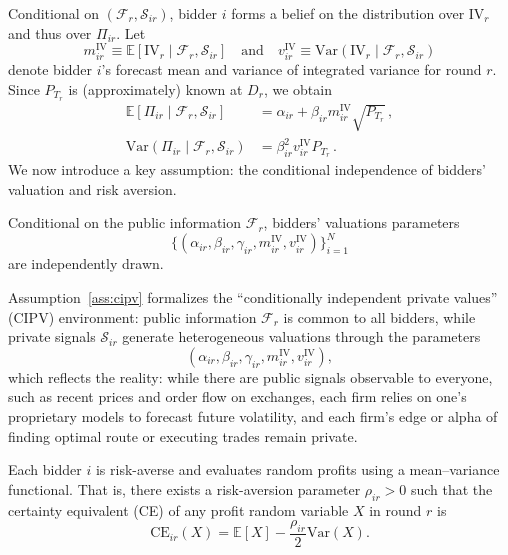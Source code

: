 \documentclass[runningheads]{llncs}
\newcommand{\E}{\mathbb{E}}
\newcommand{\Var}{\mathrm{Var}}
\newcommand{\CE}{\mathrm{CE}}
\newcommand{\IV}{\mathrm{IV}}
\begin{document}
Conditional on $(\mathcal F_r, \mathcal S_{ir})$, bidder $i$ forms a belief on the distribution over $\IV_r$ and thus over $\Pi_{ir}$. Let
\begin{equation}
m^{\IV}_{ir} \equiv \E\left[\IV_r \mid \mathcal F_r, \mathcal S_{ir} \right] \quad \text{and} \quad v^{\IV}_{ir} \equiv \Var\left(\IV_r \mid \mathcal F_r, \mathcal S_{ir} \right)
\end{equation}
denote bidder $i$'s forecast mean and variance of integrated variance for round $r$. Since $P_{T_r}$ is (approximately) known at $D_r$, we obtain
\begin{align}
  \E\!\left[\Pi_{ir} \mid \mathcal F_r, \mathcal S_{ir} \right]
    &= \alpha_{ir} + \beta_{ir} m^{\IV}_{ir} \sqrt{P_{T_r}} \, , \label{eq:profit-mean} \\
  \Var\!\left(\Pi_{ir} \mid \mathcal F_r, \mathcal S_{ir} \right)
    &= \beta_{ir}^2 v^{\IV}_{ir} P_{T_r} \, . \label{eq:profit-var}
\end{align}
We now introduce a key assumption: the conditional independence of bidders' valuation and risk aversion.

\begin{assump}[CIPV]\label{ass:cipv}
Conditional on the public information $\mathcal F_r$, bidders' valuations parameters \[\{(\alpha_{ir}, \beta_{ir}, \gamma_{ir}, m^{\IV}_{ir}, v^{\IV}_{ir})\}_{i=1}^N\] are independently drawn.
\end{assump}

\noindent Assumption~\ref{ass:cipv} formalizes the ``conditionally independent private values'' (CIPV) environment: public information $\mathcal F_r$ is common to all bidders, while private signals $\mathcal S_{ir}$ generate heterogeneous valuations through the parameters \[(\alpha_{ir}, \beta_{ir}, \gamma_{ir}, m^{\IV}_{ir}, v^{\IV}_{ir}),\] which reflects the reality: while there are public signals observable to everyone, such as recent prices and order flow on exchanges, each firm relies on one's proprietary models to forecast future volatility, and each firm's edge or alpha of finding optimal route or executing trades remain private.

\begin{assump}[Preferences]\label{ass:preferences}
Each bidder $i$ is risk-averse and evaluates random profits using a mean--variance functional. That is, there exists a risk-aversion parameter $\rho_{ir} > 0$ such that the certainty equivalent (CE) of any profit random variable $X$ in round $r$ is
\[
  \CE_{ir}(X)
  = \E[X] - \frac{\rho_{ir}}{2} \Var(X).
\]
\end{assump}
\end{document}
